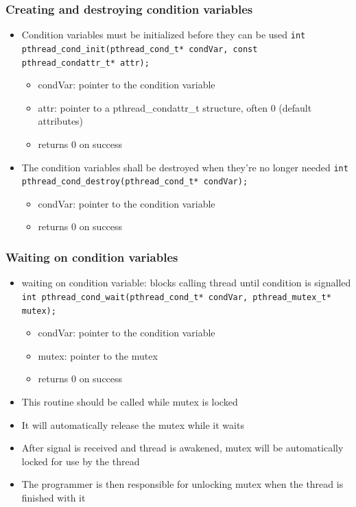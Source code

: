 \subsubsection{Creating and destroying condition variables}
\begin{itemize}
  \item Condition variables must be initialized before they can be used\newline
        \lstinline{int pthread_cond_init(pthread_cond_t* condVar, const pthread_condattr_t* attr);}
        \begin{itemize}
          \item condVar: pointer to the condition variable
          \item attr: pointer to a pthread\_condattr\_t structure, often 0 (default attributes)
          \item returns 0 on success
        \end{itemize}
  \item The condition variables shall be destroyed when they're no longer needed\newline
        \lstinline{int pthread_cond_destroy(pthread_cond_t* condVar);}
        \begin{itemize}
          \item condVar: pointer to the condition variable
          \item returns 0 on success
        \end{itemize}
\end{itemize}

\subsubsection{Waiting on condition variables}
\begin{itemize}
  \item waiting on condition variable: blocks calling thread until condition is signalled\newline
        \lstinline{int pthread_cond_wait(pthread_cond_t* condVar, pthread_mutex_t* mutex);}
        \begin{itemize}
          \item condVar: pointer to the condition variable
          \item mutex: pointer to the mutex
          \item returns 0 on success
        \end{itemize}
  \item This routine should be called while mutex is locked
  \item It will automatically release the mutex while it waits
  \item After signal is received and thread is awakened, mutex will be automatically locked for use by the thread
  \item The programmer is then responsible for unlocking mutex when the thread is finished with it
\end{itemize}

